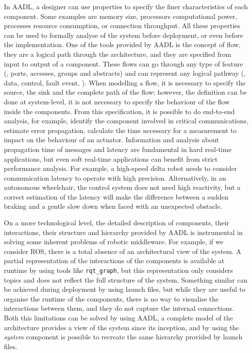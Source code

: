 In AADL, a designer can use properties to specify the finer characteristics of each component. Some examples are memory size, processors computational power, processes resource consumption, or connection throughput. All these properties can be used to formally analyse of the system before deployment, or even before the implementation. One of the tools provided by AADL is the concept of flow, they are a logical path through the architecture, and they are specified from input to output of a component. These flows can go through any type of feature (\ie, ports, accesses, groups and abstracts) and can represent any logical pathway (\eg, data, control, fault event, \etc). When modelling a flow, it is necessary to specify the source, the sink and the complete path of the flow; however, the definition can be done at system-level, it is not necessary to specify the behaviour of the flow inside the components. From this specification, it is possible to do end-to-end analysis, for example, identify the component involved in critical communications, estimate error propagation, calculate the time necessary for a measurement to impact on the behaviour of an actuator. Information and analysis about propagation time of messages and latency are fundamental in hard real-time applications, but even soft real-time applications can benefit from strict performance analysis. For example, a high-speed delta robot needs to consider communication latency to operate with high precision. Alternatively, in an autonomous wheelchair,  the control system does not need high reactivity, but a correct estimation of the latency will make the difference between a sudden braking and a gentle slow down when faced with an unexpected obstacle.

On a more technological level, the detailed description of components, their interactions, their structure and hierarchy provided by AADL is instrumental in solving some inherent problems of robotic middleware. For example, if we consider ROS, there is a total absence of an architectural view of the system. A partial representation of the interactions of the components is available at runtime by using tools like \texttt{rqt\_graph}, but this representation only considers topics and does not reflect the full structure of the system. Something similar can be achieved during deployment by using launch files, but while they are useful to organise the runtime of the components, there is no way to visualise the interactions between them, and they do not capture the internal connections. Both this limitations can be solved by using AADL, a complete model of the architecture provides a view of the system since its inception, and by using the \textit{system} component is possible to recreate the same hierarchy provided by launch files.


